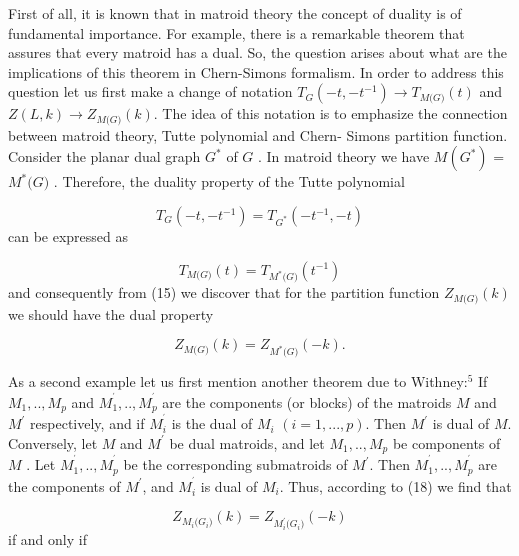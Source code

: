 \documentclass[a4paper,12pt]{article}
\begin{document}
First of all, it is known that in matroid theory the concept of duality is
of fundamental importance. For example, there is a remarkable theorem that
assures that every matroid has a dual. So, the question arises about what
are the implications of this theorem in Chern-Simons formalism. In order to
address this question let us first make a change of notation $T_{\mathit{G}%
}(-t,-t^{-1})\rightarrow T_{M(\mathit{G)}}(t)$ and $Z(L,k)\rightarrow Z_{M(%
\mathit{G)}}(k).$ The idea of this notation is to emphasize the connection
between matroid theory, Tutte polynomial and Chern- Simons partition
function. Consider the planar dual graph $\mathit{G}^{\ast }$ of $\mathit{G}$%
. In matroid theory we have $M(\mathit{G}^{\ast })$ =$M^{\ast }(\mathit{G)}$%
. Therefore, the duality property of the Tutte polynomial

\begin{equation}
T_{\mathit{G}}(-t,-t^{-1})=T_{\mathit{G}^{\ast }}(-t^{-1},-t)  \label{16}
\end{equation}
can be expressed as

\begin{equation}
T_{M(\mathit{G)}}(t)=T_{M^{\ast }(\mathit{G)}}(t^{-1})  \label{17}
\end{equation}
and consequently from (15) we discover that for the partition function $Z_{M(%
\mathit{G)}}(k)$ we should have the dual property

\begin{equation}
Z_{M(\mathit{G)}}(k)=Z_{M^{\ast }(\mathit{G)}}(-k).  \label{18}
\end{equation}

As a second example let us first mention another theorem due to Withney:$%
^{5} $ If $M_{1},..,M_{p}$ and $M_{1}^{^{\prime }},..,M_{p}^{^{\prime }}$
are the components (or blocks) of the matroids $M$ and $M^{\prime }$
respectively, and if $M_{i}^{^{\prime }}$ is the dual of $M_{i}$ $%
(i=1,...,p) $. Then $M^{\prime }$ is dual of $M$. Conversely, let $M$ and $%
M^{\prime }$ be dual matroids, and let $M_{1},..,M_{p}$ be components of $M$%
. Let $M_{1}^{^{\prime }},..,M_{p}^{^{\prime }}$ be the corresponding
submatroids of $M^{\prime }$. Then $M_{1}^{^{\prime }},..,M_{p}^{^{\prime }}$
are the components of $M^{\prime }$, and $M_{i}^{^{\prime }}$ is dual of $%
M_{i}.$ Thus, according to (18) we find that

\begin{equation}
Z_{M_{i}(\mathit{G}_{i}\mathit{)}}(k)=Z_{M_{i}^{\prime }(\mathit{G}_{i}%
\mathit{)}}(-k)  \label{19}
\end{equation}
if and only if
\end{document}

